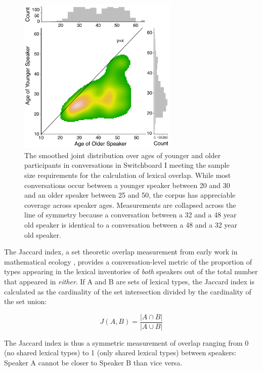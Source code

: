 \documentclass[10pt,letterpaper]{article}
\begin{document}
\begin{figure}[t]
\centering
\includegraphics[width=3in]{figures/ageHistogram_edited.pdf}
\caption{ The smoothed joint distribution over ages of younger and older participants in conversations in Switchboard I meeting the sample size requirements for the calculation of lexical overlap. While most conversations occur between a younger speaker between 20 and 30 and an older speaker between 25 and 50, the corpus has appreciable coverage across speaker ages. Measurements are collapsed across the line of symmetry because a conversation between a 32 and a 48 year old speaker is identical to a conversation between a 48 and a 32 year old speaker.}
\label{ageHistogram}
\end{figure}

The Jaccard index, a set theoretic overlap measurement from early work in mathematical ecology \citep{jaccard1912}, provides a conversation-level metric of the proportion of types appearing in the lexical inventories of \textit{both} speakers out of the total number that appeared in \textit{either}. If A and B are sets of lexical types, the Jaccard index is calculated as the cardinality of the set intersection divided  by the cardinality of the set union:

\begin{equation}
\label{eq:Jaccard} 
J(A,B) = \frac{|A\cap B| }{|A\cup B| }
\end{equation}

The Jaccard index is thus a symmetric measurement of overlap ranging from 0 (no shared lexical types) to 1 (only shared lexical types) between speakers: Speaker A cannot be closer to Speaker B than vice versa.

\end{document}
